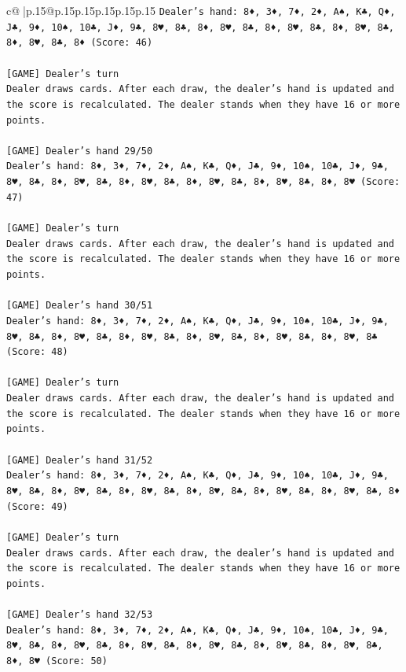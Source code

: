 \documentclass{article}
\begin{document}
{\begin{supertabular}{c@{$\;$}|p{.15\linewidth}@{}p{.15\linewidth}p{.15\linewidth}p{.15\linewidth}p{.15\linewidth}p{.15\linewidth}}
{{{\texttt{Dealer's hand: 8♦, 3♦, 7♦, 2♦, A♠, K♣, Q♦, J♣, 9♦, 10♠, 10♣, J♦, 9♣, 8♥, 8♣, 8♦, 8♥, 8♣, 8♦, 8♥, 8♣, 8♦, 8♥, 8♣, 8♦, 8♥, 8♣, 8♦ (Score: 46)} \\
\\ 
\texttt{{[}GAME{]} Dealer's turn} \\
\texttt{Dealer draws cards. After each draw, the dealer's hand is updated and the score is recalculated. The dealer stands when they have 16 or more points.} \\
\\ 
\texttt{{[}GAME{]} Dealer's hand 29/50} \\
\texttt{Dealer's hand: 8♦, 3♦, 7♦, 2♦, A♠, K♣, Q♦, J♣, 9♦, 10♠, 10♣, J♦, 9♣, 8♥, 8♣, 8♦, 8♥, 8♣, 8♦, 8♥, 8♣, 8♦, 8♥, 8♣, 8♦, 8♥, 8♣, 8♦, 8♥ (Score: 47)} \\
\\ 
\texttt{{[}GAME{]} Dealer's turn} \\
\texttt{Dealer draws cards. After each draw, the dealer's hand is updated and the score is recalculated. The dealer stands when they have 16 or more points.} \\
\\ 
\texttt{{[}GAME{]} Dealer's hand 30/51} \\
\texttt{Dealer's hand: 8♦, 3♦, 7♦, 2♦, A♠, K♣, Q♦, J♣, 9♦, 10♠, 10♣, J♦, 9♣, 8♥, 8♣, 8♦, 8♥, 8♣, 8♦, 8♥, 8♣, 8♦, 8♥, 8♣, 8♦, 8♥, 8♣, 8♦, 8♥, 8♣ (Score: 48)} \\
\\ 
\texttt{{[}GAME{]} Dealer's turn} \\
\texttt{Dealer draws cards. After each draw, the dealer's hand is updated and the score is recalculated. The dealer stands when they have 16 or more points.} \\
\\ 
\texttt{{[}GAME{]} Dealer's hand 31/52} \\
\texttt{Dealer's hand: 8♦, 3♦, 7♦, 2♦, A♠, K♣, Q♦, J♣, 9♦, 10♠, 10♣, J♦, 9♣, 8♥, 8♣, 8♦, 8♥, 8♣, 8♦, 8♥, 8♣, 8♦, 8♥, 8♣, 8♦, 8♥, 8♣, 8♦, 8♥, 8♣, 8♦ (Score: 49)} \\
\\ 
\texttt{{[}GAME{]} Dealer's turn} \\
\texttt{Dealer draws cards. After each draw, the dealer's hand is updated and the score is recalculated. The dealer stands when they have 16 or more points.} \\
\\ 
\texttt{{[}GAME{]} Dealer's hand 32/53} \\
\texttt{Dealer's hand: 8♦, 3♦, 7♦, 2♦, A♠, K♣, Q♦, J♣, 9♦, 10♠, 10♣, J♦, 9♣, 8♥, 8♣, 8♦, 8♥, 8♣, 8♦, 8♥, 8♣, 8♦, 8♥, 8♣, 8♦, 8♥, 8♣, 8♦, 8♥, 8♣, 8♦, 8♥ (Score: 50)} \\
}}}
\end{supertabular}}
\end{document}
